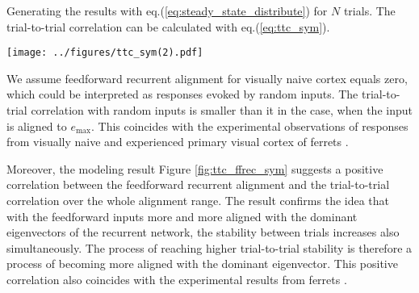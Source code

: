 \documentclass[11pt]{article}
\begin{document}
	Generating the results with eq.(\ref{eq:steady_state_distribute}) for $N$ trials. The trial-to-trial correlation can be calculated with eq.(\ref{eq:ttc_sym}). 

		\begin{SCfigure}[0.9][h] 
			\centering
			\caption[Correlation between feedforward recurrent alignment and trial-to-trial correlation for symmetric RNNs]{\textbf{Correlation between feedforward recurrent alignment and trial-to-trial correlation for symmetric RNNs.} Inputs aligned to eigenvectors $e_i$ of interaction matrix $J$ in the ascending order of eigenvalues eq.(\ref{eq:ascending_order}), resulting the feedforward recurrent alignment varies approximately between $\lambda_{\text{min}}$ and $\lambda_{\text{max}}$. For each input alignment to an eigenvector, $N=100$ trials of evoked responses were generated for calculation of the trial-to-trial correlation calculated with eq.(\ref{eq:ttc_sym}).}
			\texttt{[image: ../figures/ttc\_sym(2).pdf]}
			\label{fig:ttc_ffrec_sym}
		\end{SCfigure}
	
	We assume feedforward recurrent alignment for visually naive cortex equals zero, which could be interpreted as responses evoked by random inputs. The trial-to-trial correlation with random inputs is smaller than it in the case, when the input is aligned to $e_{\text{max}}$. This coincides with the experimental observations of responses from visually naive and experienced primary visual cortex of ferrets \cite{tragenap2023nature}. 
	
	Moreover, the modeling result Figure \ref{fig:ttc_ffrec_sym} suggests a positive correlation between the feedforward recurrent alignment and the trial-to-trial correlation over the whole alignment range. The result confirms the idea that with the feedforward inputs more and more aligned with the dominant eigenvectors of the recurrent network, the stability between trials increases also simultaneously. The process of reaching higher trial-to-trial stability is therefore a process of becoming more aligned with the dominant eigenvector. 
	This positive correlation also coincides with the experimental results from ferrets \cite{tragenap2023nature}.
	
	
\end{document}
